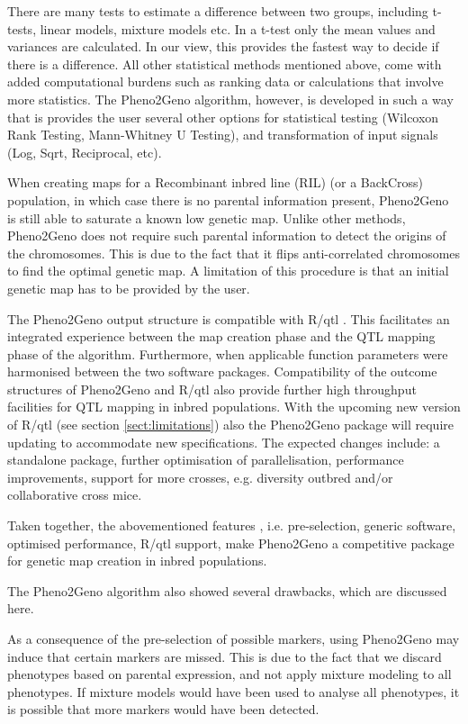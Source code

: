 There are many tests to estimate a difference between two groups, including t-tests, linear models, mixture models etc. In a t-test 
only the mean values and variances are calculated. In our view, this provides the fastest way to decide if there is a difference. 
All other statistical methods mentioned above, come with added computational burdens such as ranking data or calculations that involve 
more statistics. The Pheno2Geno algorithm, however, is developed in such a way that is provides the user several other options for statistical 
testing (Wilcoxon Rank Testing, Mann-Whitney U Testing), and transformation of input signals (Log, Sqrt, Reciprocal, etc).

When creating maps for a Recombinant inbred line (RIL) (or a BackCross) population, in which case there is no parental information 
present, Pheno2Geno is still able to saturate a known low genetic map. Unlike other methods, Pheno2Geno does not require such parental information 
to detect the origins of the chromosomes. This is due to the fact that it flips anti-correlated chromosomes to find the optimal 
genetic map. A limitation of this procedure is that an initial genetic map has to be provided by the user.

The Pheno2Geno output structure is compatible with R/qtl \cite{Broman:2003, Arends:2010}. This facilitates an integrated experience between 
the map creation phase and the QTL mapping phase of the algorithm. Furthermore, when applicable function parameters were harmonised 
between the two software packages. Compatibility of the outcome structures of Pheno2Geno and R/qtl also provide further high throughput 
facilities for QTL mapping in inbred populations. With the upcoming new version of R/qtl (see section \ref{sect:limitations}) also the Pheno2Geno package will 
require updating to accommodate new specifications. The expected changes include: a standalone package, further optimisation of 
parallelisation, performance improvements, support for more crosses, e.g. diversity outbred and/or collaborative cross mice.

Taken together, the abovementioned features , i.e. pre-selection, generic software, optimised performance, R/qtl support, make Pheno2Geno a 
competitive package for genetic map creation in inbred populations. 

The Pheno2Geno algorithm also showed several drawbacks, which are discussed here. 

As a consequence of the pre-selection of possible markers, using Pheno2Geno may induce that certain markers are missed. This is due to the 
fact that we discard phenotypes based on parental expression, and not apply mixture modeling to all phenotypes. If mixture models 
would have been used to analyse all phenotypes, it is possible that more markers would have been detected.

